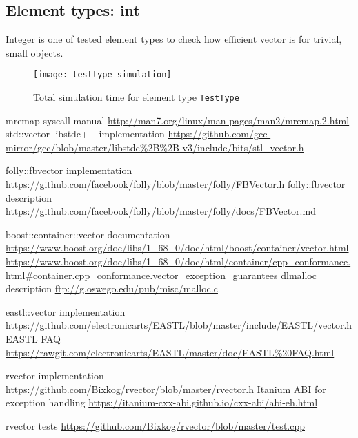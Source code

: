 \documentclass[inz, english, shortabstract]{iithesis}
\begin{document}
\subsection{Element types: int}
Integer is one of tested element types to check how efficient vector is for trivial, small objects. 

\begin{figure}[h!]
\caption{Total simulation time for element type \lstinline{TestType}}
\label{testtype_simulation}
\texttt{[image: testtype\_simulation]}
\end{figure}



\begin{thebibliography}{1}
 mremap syscall manual \url{http://man7.org/linux/man-pages/man2/mremap.2.html}
 std::vector libstdc++ implementation \url{https://github.com/gcc-mirror/gcc/blob/master/libstdc%2B%2B-v3/include/bits/stl_vector.h}

 folly::fbvector implementation \url{https://github.com/facebook/folly/blob/master/folly/FBVector.h}
 folly::fbvector description \url{https://github.com/facebook/folly/blob/master/folly/docs/FBVector.md}

 boost::container::vector documentation \url{https://www.boost.org/doc/libs/1_68_0/doc/html/boost/container/vector.html}
 \url{https://www.boost.org/doc/libs/1_68_0/doc/html/container/cpp_conformance.html#container.cpp_conformance.vector_exception_guarantees}
 dlmalloc description \url{ftp://g.oswego.edu/pub/misc/malloc.c}

 eastl::vector implementation \url{https://github.com/electronicarts/EASTL/blob/master/include/EASTL/vector.h}
 EASTL FAQ \url{https://rawgit.com/electronicarts/EASTL/master/doc/EASTL%20FAQ.html}

 rvector implementation \url{https://github.com/Bixkog/rvector/blob/master/rvector.h}
 Itanium ABI for exception handling \url{https://itanium-cxx-abi.github.io/cxx-abi/abi-eh.html}

 rvector tests \url{https://github.com/Bixkog/rvector/blob/master/test.cpp}
\end{thebibliography}


\listoffigures
\lstlistoflistings
\end{document}
